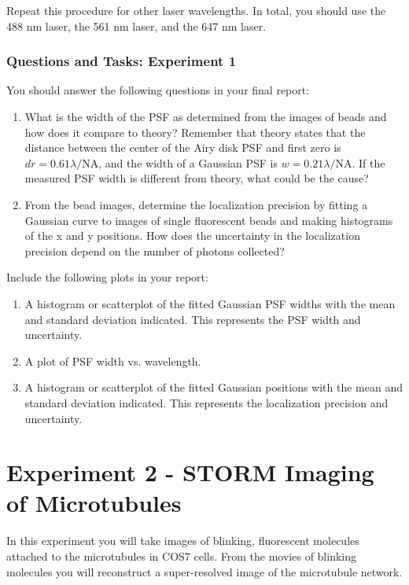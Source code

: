 \documentclass[10pt,a4paper,oneside]{book}
\begin{document}
Repeat this procedure for other laser wavelengths. In total, you should use the 488 nm laser, the 561 nm laser, and the 647 nm laser.

\subsubsection{Questions and Tasks: Experiment 1}

You should answer the following questions in your final report:

\begin{enumerate}
    \item What is the width of the PSF as determined from the images of beads and how does it compare to theory? Remember that theory states that the distance between the center of the Airy disk PSF and first zero is $dr = 0.61 \lambda / \text{NA}$, and the width of a Gaussian PSF is $w = 0.21 \lambda / \text{NA}$. If the measured PSF width is different from theory, what could be the cause?
    \item From the bead images, determine the localization precision by fitting a Gaussian curve to images of single fluorescent beads and making histograms of the x and y positions. How does the uncertainty in the localization precision depend on the number of photons collected?
\end{enumerate}

Include the following plots in your report:

\begin{enumerate}
    \item A histogram or scatterplot of the fitted Gaussian PSF widths with the mean and standard deviation indicated. This represents the PSF width and uncertainty.
    \item A plot of PSF width vs. wavelength.
    \item A histogram or scatterplot of the fitted Gaussian positions with the mean and standard deviation indicated. This represents the localization precision and uncertainty.
\end{enumerate}

\section{Experiment 2 - STORM Imaging of Microtubules}\label{sec:exp2}

In this experiment you will take images of blinking, fluorescent molecules attached to the microtubules in COS7 cells. From the movies of blinking molecules you will reconstruct a super-resolved image of the microtubule network.
\end{document}
